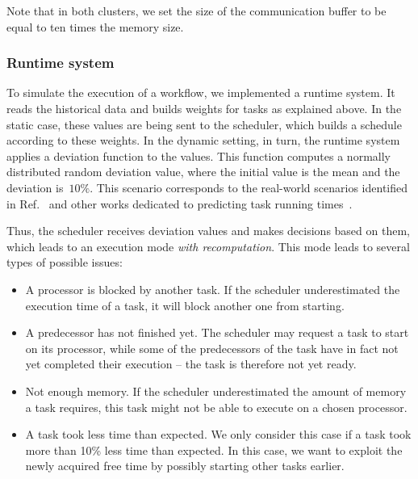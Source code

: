 \documentclass[conference]{IEEEtran}
\newcommand{\new}[1]{{\color{blue}#1}}
\begin{document}
Note that in both clusters, we set the size of the communication buffer to be equal
to ten times the memory size.


\subsubsection{Runtime system}
\label{ss:runtime-sys}
%
To simulate the execution of a workflow, we implemented a runtime system.
It reads the historical data and builds weights for tasks as explained above.
In the static case, these values are being sent to the scheduler, which builds a schedule
according to these weights.
In the dynamic setting, in turn, the runtime system applies a deviation function to the values.
This function computes a normally distributed random deviation value, where the initial value
is the mean and the deviation is~$10\%$.
This scenario corresponds to the real-world scenarios identified in Ref.~\cite{lotaru} and
other works dedicated to predicting task running times~\cite{da2015online,da2013toward}.

Thus, the scheduler receives deviation values and makes decisions based on them\new{, which
leads to an execution mode  \textit{with recomputation}.}
This mode leads to several types of possible issues:
%
\begin{itemize}
\item 
  A processor is blocked by another task. If the scheduler underestimated the execution time of a task,
  it will block another one from starting.
\item 
  A predecessor has not finished yet.
  The scheduler may request a task to start on its processor, while
  some of the predecessors of the task have in fact not yet completed their execution -- 
  the task is therefore not yet ready.
\item 
  Not enough memory. If the scheduler underestimated the amount of memory a task requires, this task might not be able to execute on a chosen processor.
\item 
  A task took less time than expected. We only consider this case if a task took more than 10\% less
  time than expected. In this case, we want to exploit the newly acquired free time by possibly starting other tasks earlier.
\end{itemize}
\end{document}
